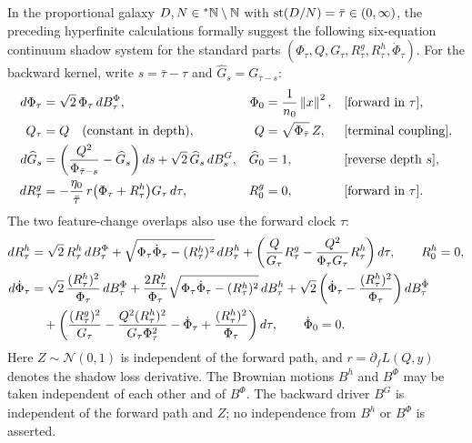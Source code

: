 \begin{theorem}
\label{thm:scalar-prop-feature-learning}
In the proportional galaxy $D, N \in {}^*\mathbb{N} \setminus \mathbb{N}$ with $\operatorname{st}(D/N) = \bar{\tau} \in (0, \infty)$, the preceding hyperfinite calculations formally suggest the following six-equation continuum shadow system for the standard parts $(\Phi_\tau, Q, G_\tau, R_\tau^g, R_\tau^h, \dot{\Phi}_\tau)$. For the backward kernel, write $s = \bar{\tau} - \tau$ and $\widehat{G}_s = G_{\bar{\tau}-s}$:
\begin{align}
d\Phi_\tau &= \sqrt{2}\,\Phi_\tau\,dB_\tau^\Phi, & \Phi_0 &= \frac{1}{n_0}\left\lVert x \right\rVert^2, && \text{[forward in $\tau$]}, \label{eq:ch6-sys-Phi} \\
Q_\tau &= Q \quad\text{(constant in depth)}, & Q &= \sqrt{\Phi_{\bar{\tau}}}\,Z, && \text{[terminal coupling]}, \label{eq:ch6-sys-Q} \\
d\widehat{G}_s &= \left(\frac{Q^2}{\Phi_{\bar{\tau}-s}} - \widehat{G}_s\right)ds + \sqrt{2}\,\widehat{G}_s\,dB_s^G, & \widehat{G}_0 &= 1, && \text{[reverse depth $s$]}, \label{eq:ch6-sys-G} \\
dR_\tau^g &= -\frac{\eta_0}{\bar{\tau}}\,r\bigl(\Phi_\tau + R_\tau^h\bigr) G_\tau\,d\tau, & R_0^g &= 0, && \text{[forward in $\tau$]}. \label{eq:ch6-sys-Rg}
\end{align}
The two feature-change overlaps also use the forward clock $\tau$:
\begin{align}
dR_\tau^h &= \sqrt{2}\,R_\tau^h\,dB_\tau^\Phi
             + \sqrt{\Phi_\tau \dot{\Phi}_\tau - (R_\tau^h)^2}\,dB_\tau^h
             + \left(\frac{Q}{G_\tau} R_\tau^g - \frac{Q^2}{\Phi_\tau G_\tau} R_\tau^h\right)d\tau, \qquad R_0^h = 0, \label{eq:ch6-sys-Rh} \\
d\dot{\Phi}_\tau &= \sqrt{2}\,\frac{(R_\tau^h)^2}{\Phi_\tau}\,dB_\tau^\Phi
                    + \frac{2 R_\tau^h}{\Phi_\tau}\sqrt{\Phi_\tau \dot{\Phi}_\tau - (R_\tau^h)^2}\,dB_\tau^h
                    + \sqrt{2}\left(\dot{\Phi}_\tau - \frac{(R_\tau^h)^2}{\Phi_\tau}\right)dB_\tau^{\dot{\Phi}} \notag \\
                 &\quad + \left(\frac{(R_\tau^g)^2}{G_\tau} - \frac{Q^2(R_\tau^h)^2}{G_\tau \Phi_\tau^2} - \dot{\Phi}_\tau + \frac{(R_\tau^h)^2}{\Phi_\tau}\right)d\tau, \qquad \dot{\Phi}_0 = 0. \label{eq:ch6-sys-dotPhi}
\end{align}
Here $Z \sim \mathcal{N}(0, 1)$ is independent of the forward path, and $r = \partial_f L(Q, y)$ denotes the shadow loss derivative. The Brownian motions $B^h$ and $B^{\dot{\Phi}}$ may be taken independent of each other and of $B^\Phi$. The backward driver $B^G$ is independent of the forward path and $Z$; no independence from $B^h$ or $B^{\dot{\Phi}}$ is asserted.
\end{theorem}

